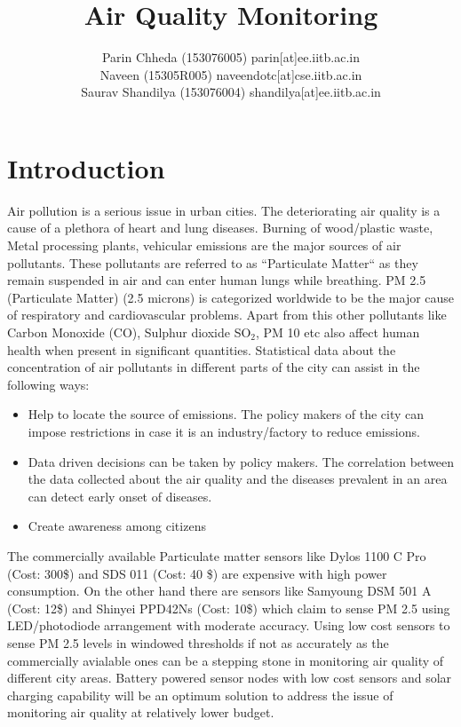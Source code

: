 \documentclass[a4paper,12pt]{article}
\begin{document}
\begin{titlepage}

\end{titlepage}
\title
	{
		Air Quality Monitoring
	}
\author
	{
		Parin Chheda (153076005) parin[at]ee.iitb.ac.in\\
		Naveen (15305R005) naveendotc[at]cse.iitb.ac.in	\\
		Saurav Shandilya (153076004) shandilya[at]ee.iitb.ac.in
	}

\maketitle


\section{Introduction}
Air pollution is a serious issue in urban cities. The deteriorating air quality is a cause of a plethora of heart and lung diseases. Burning of wood/plastic waste, Metal processing plants, vehicular emissions are the major sources of air pollutants. These pollutants are referred to as “Particulate Matter“ as they remain suspended in air and can enter human lungs while breathing. PM 2.5 (Particulate Matter) (2.5 microns) is categorized worldwide to be the major cause of respiratory and cardiovascular problems. Apart from this other pollutants like Carbon Monoxide (CO), Sulphur dioxide SO$_2$, PM 10 etc also affect human health when present in significant quantities.\cite{report_shubham}
\newline
Statistical data about the concentration of air pollutants in different parts of the city can assist in the following ways:
\begin{itemize}
\item Help to locate the source of emissions.
The policy makers of the city can impose restrictions in case it is an industry/factory to reduce emissions. 
\item Data driven decisions can be taken by policy makers.
The correlation between the data collected about the air quality and the diseases prevalent in an area can detect early onset of diseases.
\item Create awareness among citizens
\end{itemize}
The commercially available Particulate matter sensors like Dylos 1100 C Pro (Cost: 300\$) and SDS 011 (Cost: 40 \$) are expensive with high power consumption. On the other hand there are sensors like Samyoung DSM 501 A (Cost: 12\$) and Shinyei PPD42Ns (Cost: 10\$) which claim to sense PM 2.5 using LED/photodiode arrangement with moderate accuracy. 
Using low cost sensors to sense PM 2.5 levels in windowed thresholds if not as accurately as the commercially avialable ones can be a stepping stone in monitoring air quality of different city areas.
Battery powered sensor nodes with low cost sensors and solar charging capability will be an optimum solution to address the issue of monitoring air quality at relatively lower budget. 
\end{document}
